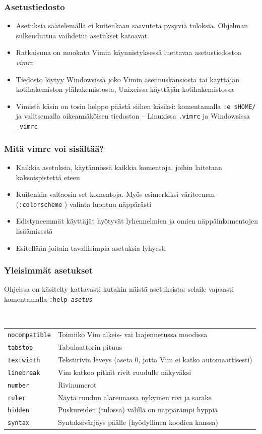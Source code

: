 \documentclass[]{beamer}
\newcommand{\Tohj}[1]{\texttt{#1}}
\newcommand{\com}[1]{{\color{blue!50!black}\Tohj{#1}} \!\!}
\newcommand{\set}[1]{\texttt{#1}}
\newcommand{\code}[1]{\texttt{#1}}
\begin{document}
\begin{frame}
    \frametitle{Asetustiedosto}
    \begin{itemize}
        \item Asetuksia säätelemällä ei kuitenkaan saavuteta pysyviä tuloksia. Ohjelman sulkeuduttua vaihdetut asetukset katoavat.
        \item Ratkaisuna on muokata Vimin käynnistyksessä luettavaa asetustiedostoa \emph{vimrc}
        \item Tiedosto löytyy Windowsissa joko Vimin asennuskansiosta tai käyttäjän kotihakemiston ylähakemistosta, Unixeissa käyttäjän kotihakemistossa
        \item Vimistä käsin on tosin helppo päästä siihen käsiksi: komentamalla \com{:e \$HOME/} ja valitsemalla oikeannäköisen tiedoston -- Linuxissa \code{.vimrc} ja Windowsissa \code{\_vimrc}
    \end{itemize}
\end{frame}

\begin{frame}
    \frametitle{Mitä vimrc voi sisältää?}
    \begin{itemize}
        \item Kaikkia asetuksia, käytännössä kaikkia komentoja, joihin laitetaan kaksoispistettä eteen
        \item Kuitenkin valtaosin set-komentoja. Myös esimerkiksi väriteeman (\com{:colorscheme}) valinta luontuu näppärästi 
        \item Edistyneemmät käyttäjät hyötyvät lyhennelmien ja omien näppäinkomentojen lisäämisestä
        \item Esitellään joitain tavallisimpia asetuksia lyhyesti
    \end{itemize}
\end{frame}

\begin{frame}
    \frametitle{Yleisimmät asetukset}
    Ohjeissa on käsitelty kattavasti kutakin näistä asetuksista:
    selaile vapaasti komentamalla \com{:help \emph{asetus}}
    
    \ \newline 
    \begin{tabular}{ll}
    \set{nocompatible} & Toimiiko Vim alkeis- vai laajennetussa moodissa \\
    \set{tabstop} & Tabulaattorin pituus \\
    \set{textwidth} & Tekstirivin leveys (aseta $0$, jotta Vim ei katko automaattisesti) \\
    \set{linebreak} & Vim katkoo pitkät rivit ruudulle näkyväksi \\
    \set{number} & Rivinumerot \\
    \set{ruler}  & Näytä ruudun alareunassa nykyinen rivi ja sarake \\
    \set{hidden} & Puskureiden (tulossa) välillä on näppärämpi hyppiä \\
    \set{syntax} & Syntaksivärjäys päälle (hyödyllinen koodien kanssa)
    \end{tabular}
\end{frame}
\end{document}
